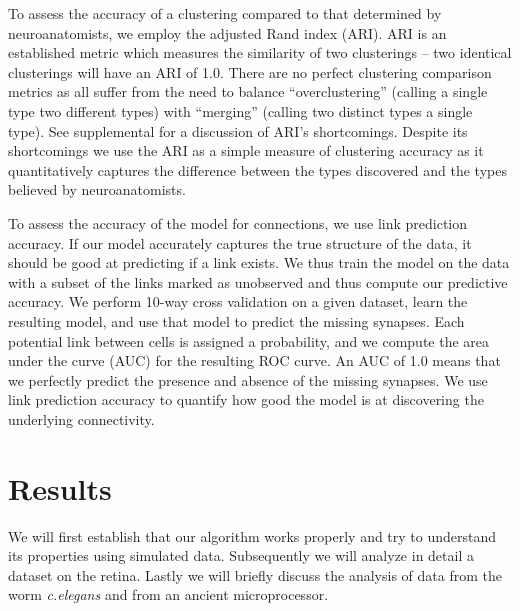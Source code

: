 \documentclass{article}
\begin{document}
To assess the accuracy of a clustering compared to that determined by
neuroanatomists, we employ the adjusted Rand index (ARI). ARI is an established metric which measures the similarity of two clusterings -- two identical clusterings will have an ARI of 1.0. There are no perfect clustering comparison metrics as all suffer from the need to balance
``overclustering'' (calling a single type two different types) with
``merging'' (calling two distinct types a single type).  See supplemental for a discussion of
ARI's shortcomings.  Despite its shortcomings we use the ARI as a simple measure of clustering accuracy as it quantitatively captures the difference between the types discovered and the types believed by neuroanatomists. 

To assess the accuracy of the model for connections, we use link prediction
accuracy. If our model accurately captures the true structure of
the data, it should be good at predicting if a link exists.
We thus train the model on the data with a subset of the links
marked as unobserved and thus compute our predictive accuracy. We perform 10-way
cross validation on a given dataset, learn the resulting model, and
use that model to predict the missing synapses. Each potential
link between cells is assigned a probability, and we compute
the area under the curve (AUC) for the resulting ROC curve. An AUC of 1.0 means that we perfectly predict the presence and absence of the missing synapses. We use link prediction accuracy to quantify how good the model is at discovering the underlying connectivity.


\section*{Results}
We will first establish that our algorithm works properly and try to understand its properties using simulated data. Subsequently we will analyze in detail a dataset on the retina. Lastly we will briefly discuss the analysis of data from the worm \textit{c.elegans} and from an ancient microprocessor.  
\end{document}
